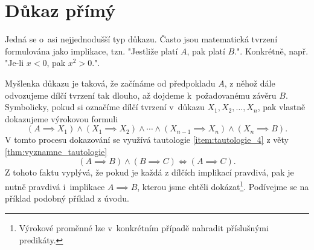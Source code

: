 \section{Důkaz přímý}\label{sec:dukaz_primy}
Jedná se o~asi nejjednodušší typ důkazu. Často jsou matematická tvrzení formulována jako implikace, tzn. "Jestliže platí $A$, pak platí $B$.". Konkrétně, např. "Je-li $x<0$, pak $x^2>0$.".\par
Myšlenka důkazu je taková, že začínáme od předpokladu $A$, z něhož dále odvozujeme dílčí tvrzení tak dlouho, až dojdeme k~požadovanému závěru $B$. Symbolicky, pokud si označíme dílčí tvrzení v~důkazu $X_1, X_2, \dots, X_n$, pak vlastně dokazujeme výrokovou formuli
\begin{equation}\label{eq:primy_dukaz_formule}
    (A \implies X_1) \land (X_1 \implies X_2) \land \cdots \land (X_{n-1}\implies X_n) \land (X_n \implies B).
\end{equation}
V tomto procesu dokazování se využívá tautologie \ref{item:tautologie_4} z věty \ref{thm:vyznamne_tautologie}
\begin{equation*}
    (A \implies B) \land (B \implies C) \iff (A \implies C).
\end{equation*}
Z tohoto faktu vyplývá, že pokud je každá z dílčích implikací pravdivá, pak je nutně pravdivá i~implikace $A \implies B$, kterou jsme chtěli dokázat\footnote{Výrokové proměnné lze v~konkrétním případě nahradit příslušnými predikáty.}. Podívejme se na příklad podobný příklad z úvodu.

